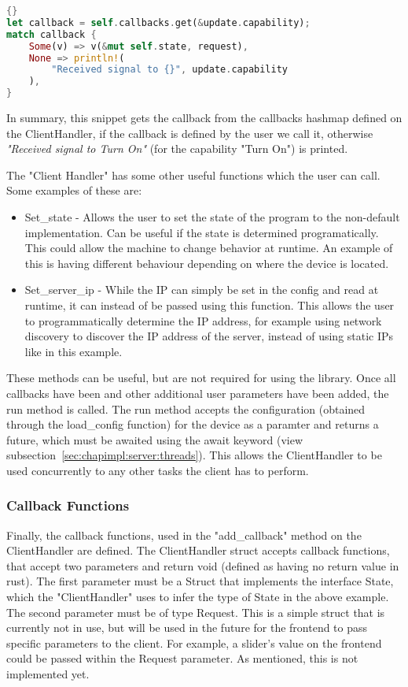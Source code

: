 \begin{lstlisting}[language=Rust, style=boxed, showstringspaces=false]{}
let callback = self.callbacks.get(&update.capability);
match callback {
    Some(v) => v(&mut self.state, request),
    None => println!(
        "Received signal to {}", update.capability
    ),
}
\end{lstlisting}
In summary, this snippet gets the callback from the callbacks hashmap defined on the ClientHandler, if the callback is defined by the user we call it, otherwise \textit{"Received signal to Turn On"} (for the capability "Turn On") is printed.

The "Client Handler" has some other useful functions which the user can call. Some examples of these are:
\begin{itemize}
    \item Set\_state - Allows the user to set the state of the program to the non-default implementation. Can be useful if the state is determined programatically. This could allow the machine to change behavior at runtime. An example of this is having different behaviour depending on where the device is located.
    \item Set\_server\_ip - While the IP can simply be set in the config and read at runtime, it can instead of be passed using this function. This allows the user to programmatically determine the IP address, for example using network discovery to discover the IP address of the server, instead of using static IPs like in this example.
\end{itemize}

These methods can be useful, but are not required for using the library. Once all callbacks have been and other additional user parameters have been added, the run method is called. The run method accepts the configuration (obtained through the load\_config function) for the device as a paramter and returns a future, which must be awaited using the await keyword (view subsection~\ref{sec:chapimpl:server:threads}). This allows the ClientHandler to be used concurrently to any other tasks the client has to perform. 

\subsubsection{Callback Functions}
Finally, the callback functions, used in the "add\_callback" method on the ClientHandler are defined. The ClientHandler struct accepts callback functions, that accept two parameters and return void (defined as having no return value in rust). The first parameter must be a Struct that implements the interface State, which the "ClientHandler" uses to infer the type of State in the above example. The second parameter must be of type Request. This is a simple struct that is currently not in use, but will be used in the future for the frontend to pass specific parameters to the client. For example, a slider's value on the frontend could be passed within the Request parameter. As mentioned, this is not implemented yet.

